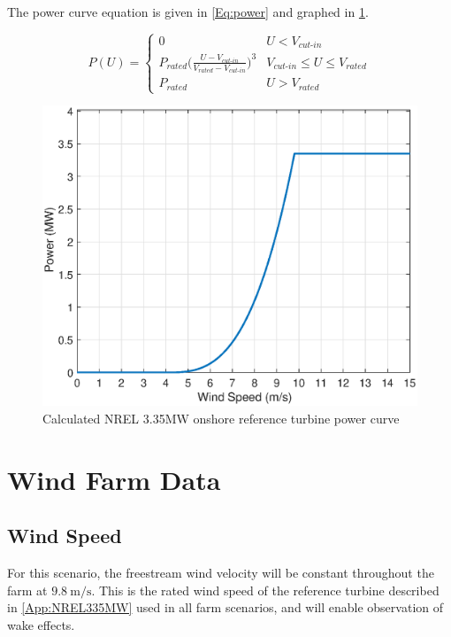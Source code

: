 \documentclass[12pt]{article}
\begin{document}
    \noindent The power curve equation is given in \cref{Eq:power} and graphed in \cref{Fig:curve}.
    
    \begin{equation}
        P(U) = 
            \begin{cases} 
                  0 & U < V_{\textit{cut-in}} \\
                  P_{\textit{rated}}\bigg(\frac{U-V_{\textit{cut-in}}}{V_{\textit{rated}}-V_{\textit{cut-in}}}\bigg)^3 & V_{\textit{cut-in}}\leq U \leq V_{\textit{rated}} \\
                  P_{\textit{rated}} & U > V_{\textit{rated}}
            \end{cases}
        \label{Eq:power}
    \end{equation}
    
    \begin{figure}[H]
        \centering
        \caption{Calculated NREL 3.35MW onshore reference turbine power curve \label{Fig:curve}}
        \includegraphics[width=0.75\linewidth]{power-curve.eps}
    \end{figure}

\newpage
\section{Wind Farm Data}
    \subsection{Wind Speed}
        For this scenario, the freestream wind velocity will be constant throughout the farm at $9.8\ \textrm{m/s}$. This is the rated wind speed of the reference turbine described in \cref{App:NREL335MW} used in all farm scenarios, and will enable observation of wake effects.
    
\end{document}
